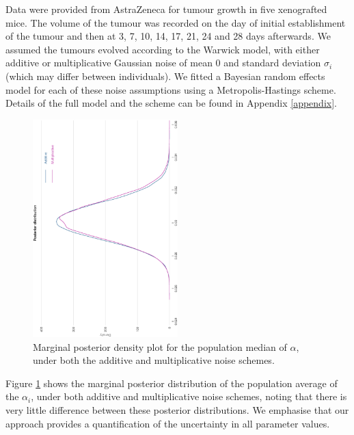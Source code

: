 \documentclass[11pt,a4paper]{article}
\begin{document}
Data were provided from AstraZeneca for tumour growth in five xenografted mice. The volume of the tumour was recorded on the day of initial establishment of the tumour and then at 3, 7, 10, 14, 17, 21, 24 and 28 days afterwards. We assumed the tumours evolved according to the Warwick model, with either additive or multiplicative Gaussian noise of mean 0 and standard deviation $\sigma_i$ (which may differ between individuals). We fitted a Bayesian random effects model for each of these noise assumptions using a Metropolis-Hastings scheme. Details of the full model and the scheme can be found in Appendix \ref{appendix}.
\begin{figure}
\centering
\includegraphics[width=0.5\textwidth, angle=270]{alphaBarDensity.eps}
\caption{Marginal posterior density plot for the population median of $\alpha$, under both the additive and multiplicative noise schemes.}
\label{fig:alphaBarDensity}
\end{figure}
Figure \ref{fig:alphaBarDensity} shows the marginal posterior distribution of the population average of the $\alpha_i$, under both additive and multiplicative noise schemes, noting that there is very little difference between these posterior distributions. We emphasise that our approach provides a quantification of the uncertainty in all parameter values.
\end{document}
